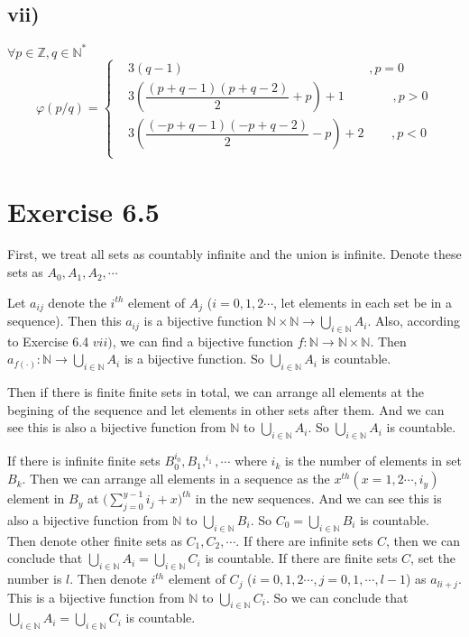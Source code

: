 \documentclass[a4paper,12pt,titlepage]{article}
\begin{document}
\subsection*{vii)}

$\forall p\in\mathbb{Z},q\in\mathbb{N}^*$
$$\varphi(p/q)=\left\{
\begin{aligned}
&3(q-1)\,\,\,\,\quad\quad\quad\quad\quad\quad\quad\quad\quad\quad\quad\quad\quad\quad,p=0\\
&3(\dfrac{(p+q-1)(p+q-2)}{2}+p)+1\quad\,\,\,\,\quad\quad\,, p>0\\
&3(\dfrac{(-p+q-1)(-p+q-2)}{2}-p)+2\quad\quad\,, p<0\\
\end{aligned}
\right.
$$

\section*{Exercise 6.5}
First, we treat all sets as countably infinite and the union is infinite. Denote these sets as $A_0,A_1,A_2,\cdots$

Let $a_{ij}$ denote the $i^{th}$ element of $A_j$ ($i=0,1,2\cdots$, let elements in each set be in a sequence). Then this $a_{ij}$ is a bijective function $\mathbb{N}\times\mathbb{N}\rightarrow \bigcup_{i\in\mathbb{N}}A_i$. Also, according to Exercise 6.4 $vii)$, we can find a bijective function $f:\mathbb{N}\rightarrow\mathbb{N}\times\mathbb{N}$. Then $a_{f(\cdot)}:\mathbb{N}\rightarrow \bigcup_{i\in\mathbb{N}}A_i$ is a bijective function. So $\bigcup_{i\in\mathbb{N}}A_i$  is countable.

Then if there is finite finite sets in total, we can arrange all elements at the begining of the sequence and let elements in other sets after them. And we can see this is also a bijective function from $\mathbb{N}$ to  $\bigcup_{i\in\mathbb{N}}A_i$. So $\bigcup_{i\in\mathbb{N}}A_i$  is countable.

If there is infinite finite sets $B_0^{i_0},B_1,^{i_1},\cdots$ where $i_k$ is the number of elements in set $B_k$. Then we can arrange all elements in a sequence as the $x^{th}(x=1,2\cdots,i_y)$ element in $B_y$ at $\big(\sum\limits_{j=0}^{y-1}i_j+x\big)^{th}$ in the new sequences. And we can see this is also a bijective function from $\mathbb{N}$ to  $\bigcup_{i\in\mathbb{N}}B_i$. So $C_0=\bigcup_{i\in\mathbb{N}}B_i$  is countable. Then denote other finite sets as $C_1,C_2,\cdots$. If there are infinite sets $C$, then we can conclude that $\bigcup_{i\in\mathbb{N}}A_i=\bigcup_{i\in\mathbb{N}}C_i$ is countable. If there are finite sets $C$, set the number is $l$. Then denote $i^{th}$ element of $C_j$ ($i=0,1,2\cdots,j=0,1,\cdots,l-1$) as $a_{li+j}$. This is a bijective function from $\mathbb{N}$ to $\bigcup_{i\in\mathbb{N}}C_i$. So we can conclude that $\bigcup_{i\in\mathbb{N}}A_i=\bigcup_{i\in\mathbb{N}}C_i$ is countable. 
\end{document}

